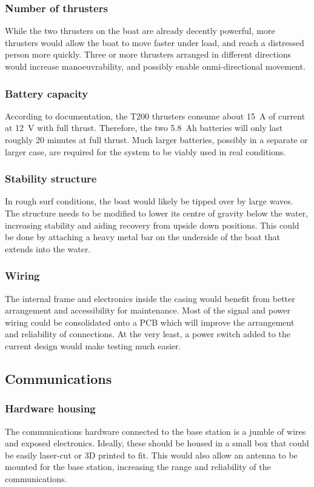 \documentclass[a4paper]{IEEEtran}
\begin{document}
\subsubsection{Number of thrusters}
While the two thrusters on the boat are already decently powerful, more thrusters would allow the boat to move faster under load, and reach a distressed person more quickly. Three or more thrusters arranged in different directions would increase manoeuvrability, and possibly enable onmi-directional movement.

\subsubsection{Battery capacity}
According to documentation, the T200 thrusters consume about \SI{15}{A} of current at \SI{12}{V} with full thrust. Therefore, the two \SI{5.8}{Ah} batteries will only last roughly 20 minutes at full thrust. Much larger batteries, possibly in a separate or larger case, are required for the system to be viably used in real conditions.

\subsubsection{Stability structure}
In rough surf conditions, the boat would likely be tipped over by large waves. The structure needs to be modified to lower its centre of gravity below the water, increasing stability and aiding recovery from upside down positions. This could be done by attaching a heavy metal bar on the underside of the boat that extends into the water.

\subsubsection{Wiring}
The internal frame and electronics inside the casing would benefit from better arrangement and accessibility for maintenance. Most of the signal and power wiring could be consolidated onto a PCB which will improve the arrangement and reliability of connections. At the very least, a power switch added to the current design would make testing much easier.

\subsection{Communications}

\subsubsection{Hardware housing}
The communications hardware connected to the base station is a jumble of wires and exposed electronics. Ideally, these should be housed in a small box that could be easily laser-cut or 3D printed to fit. This would also allow an antenna to be mounted for the base station, increasing the range and reliability of the communications.
\end{document}
